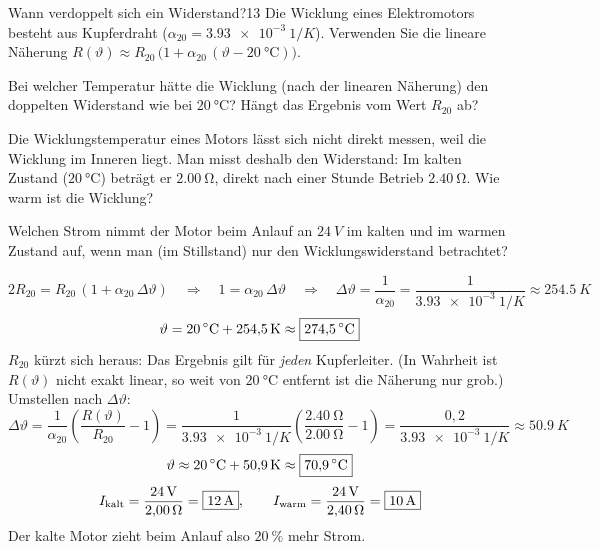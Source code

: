 \documentclass[11pt,a4paper]{article}
\begin{document}
\begin{aufgabe}{Wann verdoppelt sich ein Widerstand?}{13}
Die Wicklung eines Elektromotors besteht aus Kupferdraht ($\alpha_{20} = \SI{3.93e-3}{1/K}$). Verwenden Sie die lineare Näherung
$R(\vartheta) \approx R_{20}\,\bigl(1 + \alpha_{20}\,(\vartheta - \SI{20}{\celsius})\bigr)$.
\begin{teilaufgaben}
  \item Bei welcher Temperatur hätte die Wicklung (nach der linearen Näherung) den doppelten Widerstand wie bei $\SI{20}{\celsius}$? Hängt das Ergebnis vom Wert $R_{20}$ ab?
  \item Die Wicklungstemperatur eines Motors lässt sich nicht direkt messen, weil die Wicklung im Inneren liegt. Man misst deshalb den Widerstand: Im kalten Zustand ($\SI{20}{\celsius}$) beträgt er $\SI{2.00}{\ohm}$, direkt nach einer Stunde Betrieb $\SI{2.40}{\ohm}$. Wie warm ist die Wicklung?
  \item Welchen Strom nimmt der Motor beim Anlauf an $\SI{24}{V}$ im kalten und im warmen Zustand auf, wenn man (im Stillstand) nur den Wicklungswiderstand betrachtet?
\end{teilaufgaben}
\end{aufgabe}

\begin{loesung}
\[
  2R_{20} = R_{20}\,(1 + \alpha_{20}\,\Delta\vartheta)
  \quad\Rightarrow\quad 1 = \alpha_{20}\,\Delta\vartheta
  \quad\Rightarrow\quad \Delta\vartheta = \frac{1}{\alpha_{20}} = \frac{1}{\SI{3.93e-3}{1/K}} \approx \SI{254.5}{K}
\]
\[
  \vartheta = \SI{20}{\celsius} + \SI{254.5}{K} \approx \boxed{\SI{274.5}{\celsius}}
\]
$R_{20}$ kürzt sich heraus: Das Ergebnis gilt für \emph{jeden} Kupferleiter. (In Wahrheit ist $R(\vartheta)$ nicht exakt linear, so weit von $\SI{20}{\celsius}$ entfernt ist die Näherung nur grob.)
Umstellen nach $\Delta\vartheta$:
\[
  \Delta\vartheta = \frac{1}{\alpha_{20}}\left(\frac{R(\vartheta)}{R_{20}} - 1\right)
  = \frac{1}{\SI{3.93e-3}{1/K}}\left(\frac{\SI{2.40}{\ohm}}{\SI{2.00}{\ohm}} - 1\right)
  = \frac{0{,}2}{\SI{3.93e-3}{1/K}} \approx \SI{50.9}{K}
\]
\[
  \vartheta \approx \SI{20}{\celsius} + \SI{50.9}{K} \approx \boxed{\SI{70.9}{\celsius}}
\]
\[
  I_\text{kalt} = \frac{\SI{24}{V}}{\SI{2.00}{\ohm}} = \boxed{\SI{12}{A}}, \qquad
  I_\text{warm} = \frac{\SI{24}{V}}{\SI{2.40}{\ohm}} = \boxed{\SI{10}{A}}
\]
Der kalte Motor zieht beim Anlauf also $\SI{20}{\percent}$ mehr Strom.
\end{loesung}
\end{document}
